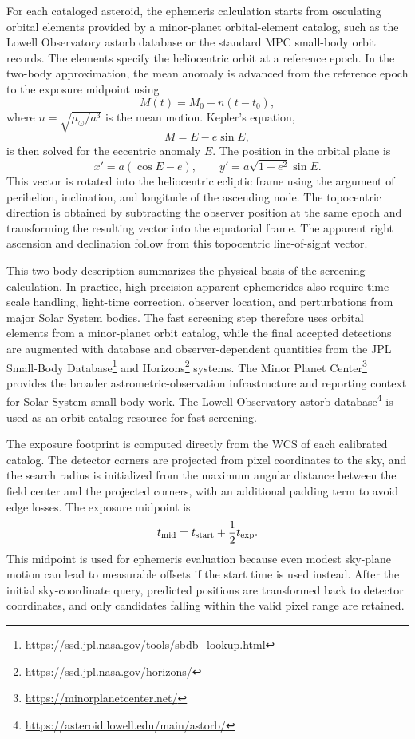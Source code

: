 \documentclass[referee]{raa}
\begin{document}
For each cataloged asteroid, the ephemeris calculation starts from osculating orbital elements provided by a minor-planet orbital-element catalog, such as the Lowell Observatory astorb database or the standard MPC small-body orbit records. The elements specify the heliocentric orbit at a reference epoch. In the two-body approximation, the mean anomaly is advanced from the reference epoch to the exposure midpoint using
\begin{equation}
M(t)=M_0+n(t-t_0),
\end{equation}
where \(n=\sqrt{\mu_{\odot}/a^3}\) is the mean motion. Kepler's equation,
\begin{equation}
M=E-e\sin E,
\end{equation}
is then solved for the eccentric anomaly \(E\). The position in the orbital plane is
\begin{equation}
x'=a(\cos E-e), \qquad
y'=a\sqrt{1-e^2}\sin E .
\end{equation}
This vector is rotated into the heliocentric ecliptic frame using the argument of perihelion, inclination, and longitude of the ascending node. The topocentric direction is obtained by subtracting the observer position at the same epoch and transforming the resulting vector into the equatorial frame. The apparent right ascension and declination follow from this topocentric line-of-sight vector.

This two-body description summarizes the physical basis of the screening calculation. In practice, high-precision apparent ephemerides also require time-scale handling, light-time correction, observer location, and perturbations from major Solar System bodies. The fast screening step therefore uses orbital elements from a minor-planet orbit catalog, while the final accepted detections are augmented with database and observer-dependent quantities from the JPL Small-Body Database\footnote{\url{https://ssd.jpl.nasa.gov/tools/sbdb_lookup.html}} and Horizons\footnote{\url{https://ssd.jpl.nasa.gov/horizons/}} systems. The Minor Planet Center\footnote{\url{https://minorplanetcenter.net/}} provides the broader astrometric-observation infrastructure and reporting context for Solar System small-body work. The Lowell Observatory astorb database\footnote{\url{https://asteroid.lowell.edu/main/astorb/}} is used as an orbit-catalog resource for fast screening.

The exposure footprint is computed directly from the WCS of each calibrated catalog. The detector corners are projected from pixel coordinates to the sky, and the search radius is initialized from the maximum angular distance between the field center and the projected corners, with an additional padding term to avoid edge losses. The exposure midpoint is
\begin{equation}
t_{\rm mid}=t_{\rm start}+\frac{1}{2}t_{\rm exp}.
\end{equation}
This midpoint is used for ephemeris evaluation because even modest sky-plane motion can lead to measurable offsets if the start time is used instead. After the initial sky-coordinate query, predicted positions are transformed back to detector coordinates, and only candidates falling within the valid pixel range are retained.
\end{document}
